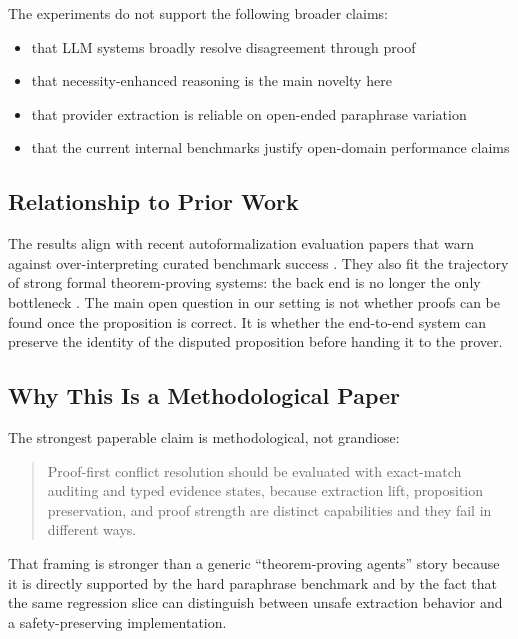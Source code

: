 \documentclass[11pt]{article}
\begin{document}
The experiments do not support the following broader claims:

\begin{itemize}
  \item that LLM systems broadly resolve disagreement through proof
  \item that necessity-enhanced reasoning is the main novelty here
  \item that provider extraction is reliable on open-ended paraphrase variation
  \item that the current internal benchmarks justify open-domain performance
  claims
\end{itemize}

\subsection{Relationship to Prior Work}

The results align with recent autoformalization evaluation papers that warn
against over-interpreting curated benchmark success
\citep{poiroux2025reliable,poiroux2025rlmeval,zhang2025wild}. They also fit the
trajectory of strong formal theorem-proving systems: the back end is no longer
the only bottleneck \citep{yang2023leandojo,hsieh2025bfs,ren2025deepseek}. The
main open question in our setting is not whether proofs can be found once the
proposition is correct. It is whether the end-to-end system can preserve the
identity of the disputed proposition before handing it to the prover.

\subsection{Why This Is a Methodological Paper}

The strongest paperable claim is methodological, not grandiose:

\begin{quote}
Proof-first conflict resolution should be evaluated with exact-match auditing
and typed evidence states, because extraction lift, proposition preservation,
and proof strength are distinct capabilities and they fail in different ways.
\end{quote}

That framing is stronger than a generic ``theorem-proving agents'' story
because it is directly supported by the hard paraphrase benchmark and by the
fact that the same regression slice can distinguish between unsafe extraction
behavior and a safety-preserving implementation.
\end{document}
